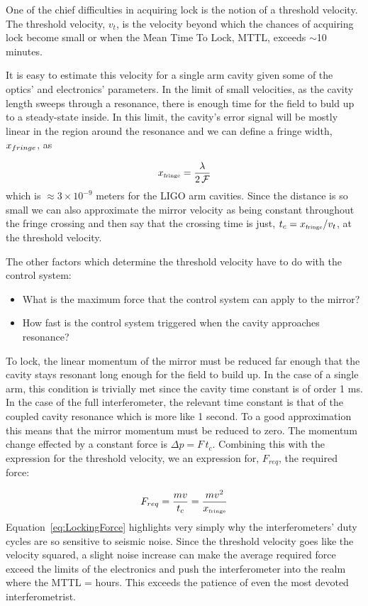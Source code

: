 One of the chief difficulties in acquiring lock is the notion of a threshold velocity.
The threshold velocity, $v_t$, is the velocity beyond which the chances of acquiring
lock become small or when the Mean Time To Lock, MTTL, exceeds $\sim$10 minutes.

It is easy to estimate this velocity for a single arm cavity given some of the
optics' and electronics' parameters. In the limit of small velocities, as the
cavity length sweeps through a resonance, there is enough time for the field to
buld up to a steady-state inside. In this limit, the cavity's error signal will
be mostly linear in the region around the resonance and we can define a fringe
width, $x_{\tiny fringe}$, as

\begin{equation}
x_{\mbox{\tiny fringe}} = \frac{\lambda}{2 \, \mathcal{F}}
\end{equation}
which is $\approx3 \times 10^{-9}$ meters for the LIGO arm cavities. Since the distance
is so small we can also approximate the mirror velocity as being constant throughout
the fringe crossing and then say that the crossing time is just, 
$t_c = x_{\mbox{\tiny fringe}}/v_t$, at the threshold velocity.

The other factors which determine the threshold velocity have to do with the 
control system:
\begin{itemize}
\item What is the maximum force that the control system can apply to the mirror?
\item How fast is the control system triggered when the cavity approaches resonance?
\end{itemize}

To lock, the linear momentum of the mirror must be reduced far enough that the
cavity stays resonant long enough for the field to build up. In the case of a single
arm, this condition is trivially met since the cavity time constant is of order 1 ms. 
In the case of the full interferometer, the relevant time constant is that of the coupled 
cavity resonance which is more like 1 second. To a good approximation this means
that the mirror momentum must be reduced to zero. The momentum change effected
by a constant force is $\Delta p = F \, t_c$. Combining this with the expression
for the threshold velocity, we an expression for, $F_{req}$, the required force:

\begin{equation}
F_{req} = \frac{m v}{t_c} = \frac{m v^2}{x_{\mbox{\tiny fringe}}}
\label{eq:LockingForce}
\end{equation}
Equation~\ref{eq:LockingForce} highlights very simply why the interferometers'
duty cycles are so sensitive to seismic noise. Since the threshold velocity
goes like the velocity squared, a slight noise increase can make the average
required force exceed the limits of the electronics and push the interferometer
into the realm where the MTTL = hours. This exceeds the patience of even the
most devoted interferometrist.


